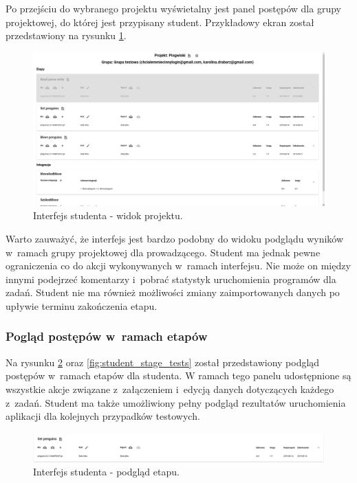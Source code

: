 Po przejściu do wybranego projektu wyświetalny jest panel postępów dla grupy projektowej, do której jest przypisany student.
Przykładowy ekran został przedstawiony na rysunku \ref{fig:student_project_board}.

\begin{figure}[h]
    \centering
    \includegraphics[width = 16cm]{chapter04/student_project_board.png}
    \caption{Interfejs studenta - widok projektu.}
    \label{fig:student_project_board}
\end{figure}

Warto zauważyć, że interfejs jest bardzo podobny do widoku podglądu wyników w~ramach grupy projektowej dla prowadzącego.
Student ma jednak pewne ograniczenia co do akcji wykonywanych w~ramach interfejsu.
Nie może on między innymi podejrzeć komentarzy i~pobrać statystyk uruchomienia programów dla zadań.
Student nie ma również możliwości zmiany zaimportowanych danych po upływie terminu zakończenia etapu.

\subsubsection{Pogląd postępów w~ramach etapów}

Na rysunku \ref{fig:student_stage} oraz \ref{fig:student_stage_tests} został przedstawiony podgląd postępów w~ramach etapów dla studenta.
W ramach tego panelu udostępnione są wszystkie akcje związane z~załączeniem i~edycją danych dotyczących każdego z~zadań.
Student ma także umożliwiony pełny podgląd rezultatów uruchomienia aplikacji dla kolejnych przypadków testowych.

\begin{figure}[h]
    \centering
    \includegraphics[width = 16cm]{chapter04/student_stage.png}
    \caption{Interfejs studenta - podgląd etapu.}
    \label{fig:student_stage}
\end{figure}

